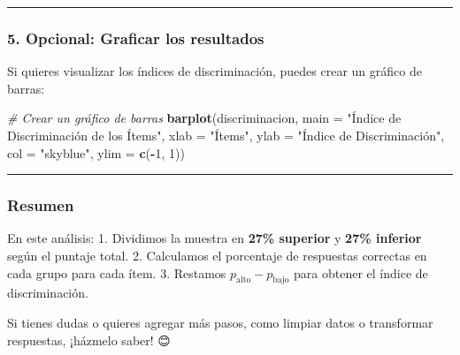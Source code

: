 \documentclass[
]{article}
\newenvironment{Shaded}{\begin{snugshade}}{\end{snugshade}}
\newcommand{\AttributeTok}[1]{\textcolor[rgb]{0.13,0.29,0.53}{#1}}
\newcommand{\CommentTok}[1]{\textcolor[rgb]{0.56,0.35,0.01}{\textit{#1}}}
\newcommand{\DecValTok}[1]{\textcolor[rgb]{0.00,0.00,0.81}{#1}}
\newcommand{\FunctionTok}[1]{\textcolor[rgb]{0.13,0.29,0.53}{\textbf{#1}}}
\newcommand{\NormalTok}[1]{#1}
\newcommand{\SpecialCharTok}[1]{\textcolor[rgb]{0.81,0.36,0.00}{\textbf{#1}}}
\newcommand{\StringTok}[1]{\textcolor[rgb]{0.31,0.60,0.02}{#1}}
\begin{document}
\begin{center}\rule{0.5\linewidth}{0.5pt}\end{center}

\subsubsection{\texorpdfstring{\textbf{5. Opcional: Graficar los
resultados}}{5. Opcional: Graficar los resultados}}\label{opcional-graficar-los-resultados}

Si quieres visualizar los índices de discriminación, puedes crear un
gráfico de barras:

\begin{Shaded}
\begin{Highlighting}[]
\CommentTok{\# Crear un gráfico de barras}
\FunctionTok{barplot}\NormalTok{(discriminacion, }
        \AttributeTok{main =} \StringTok{"Índice de Discriminación de los Ítems"}\NormalTok{,}
        \AttributeTok{xlab =} \StringTok{"Ítems"}\NormalTok{, }
        \AttributeTok{ylab =} \StringTok{"Índice de Discriminación"}\NormalTok{,}
        \AttributeTok{col =} \StringTok{"skyblue"}\NormalTok{, }
        \AttributeTok{ylim =} \FunctionTok{c}\NormalTok{(}\SpecialCharTok{{-}}\DecValTok{1}\NormalTok{, }\DecValTok{1}\NormalTok{))}
\end{Highlighting}
\end{Shaded}

\begin{center}\rule{0.5\linewidth}{0.5pt}\end{center}

\subsubsection{\texorpdfstring{\textbf{Resumen}}{Resumen}}\label{resumen}

En este análisis: 1. Dividimos la muestra en \textbf{27\% superior} y
\textbf{27\% inferior} según el puntaje total. 2. Calculamos el
porcentaje de respuestas correctas en cada grupo para cada ítem. 3.
Restamos \(p_{\text{alto}} - p_{\text{bajo}}\) para obtener el índice de
discriminación.

Si tienes dudas o quieres agregar más pasos, como limpiar datos o
transformar respuestas, ¡házmelo saber! 😊
\end{document}

